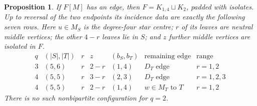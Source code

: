 \documentclass[11pt]{article}
\newtheorem{proposition}[theorem]{Proposition}
\newcommand{\sq}{\sqcup}
\begin{document}
\begin{proposition}\label{MM}
If $F[M]$ has an edge, then $F=K_{1,4}\sq K_2$, padded with isolates.
Up to reversal of the two endpoints its incidence data are exactly the
following seven rows. Here $u\in M_S$ is the degree-four star centre;
$r$ of its leaves are neutral middle vertices; the other $4-r$ leaves
lie in $S$; and $z$ further middle vertices are isolated in $F$.
\[
\begin{array}{c|c|c|c|c|c|c}
q&(|S|,|T|)&r&z&(b_S,b_T)&\text{remaining edge}&\text{range}\\\hline
3&(5,6)&r&2-r&(1,4)&D_T\text{ edge}&r=1,2\\
4&(5,5)&r&3-r&(2,3)&D_T\text{ edge}&r=1,2,3\\
4&(5,5)&r&2-r&(1,4)&w\!\in\!M_T\text{ to }T&r=1,2
\end{array}
\]
There is no such nonbipartite configuration for $q=2$.
\end{proposition}
\end{document}
